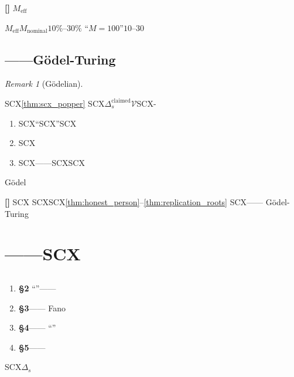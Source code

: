 \documentclass[11pt,a4paper]{article}
\theoremstyle{remark}
\newtheorem{remark}[theorem]{Remark}
\newcommand{\honeststrike}{\textnormal{\textbf{[]}}}
\begin{document}
\honeststrike{} \textbf{$M_{\text{eff}}$}

$M_{\text{eff}}$$M_{\text{nominal}}$$10\%$--$30\%$
``$M=100$''$10$--$30$


\subsection{——Gödel-Turing}

\begin{remark}[Gödelian]
\label{rem:godel}

SCX\ref{thm:scx_popper}
SCX$\Delta_s^{\text{claimed}}$$\mathcal{V}$SCX-
\textbf{}
\begin{enumerate}[label=(\arabic*)]
    \item SCX``SCX''SCX
    \item SCX
    \item SCX——SCXSCX
\end{enumerate}
Gödel

\end{remark}

\honeststrike{} \textbf{}SCX
SCX\textbf{}SCX\ref{thm:honest_person}--\ref{thm:replication_roots}
SCX——
Gödel-Turing

\section{——SCX}

\subsection{}



\begin{enumerate}[label=(\arabic*)]
    \item \textbf{\S2}\textbf{}
          ``''——
    \item \textbf{\S3}\textbf{}——
          Fano
    \item \textbf{\S4}\textbf{}——
          ``''
    \item \textbf{\S5}\textbf{}——
          
\end{enumerate}


SCX$\Delta_s$

\subsection{}
\end{document}
